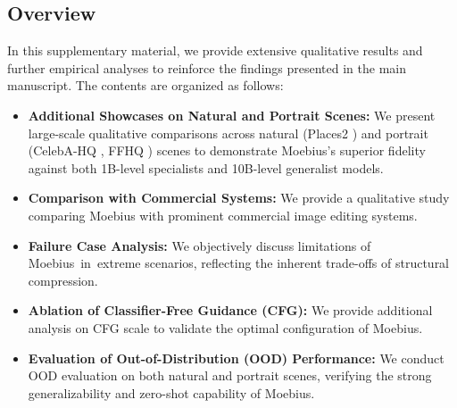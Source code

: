 \documentclass[runningheads]{llncs}
\begin{document}
\subsection*{Overview}
In this supplementary material, we provide extensive qualitative results and further empirical analyses to reinforce the findings presented in the main manuscript. The contents are organized as follows:
\begin{itemize}
    \item \textbf{Additional Showcases on Natural and Portrait Scenes:} We present large-scale qualitative comparisons across natural (Places2 \cite{zhou2017places}) and portrait (CelebA-HQ \cite{karras2018celebahq}, FFHQ \cite{karras2018stylegan_ffhq}) scenes to demonstrate Moebius's superior fidelity against both 1B-level specialists and 10B-level generalist models.
    \item \textbf{Comparison with Commercial Systems:} We provide a qualitative study comparing Moebius with prominent commercial image editing systems.
    \item \textbf{Failure Case Analysis:} We objectively discuss limitations of Moebius~in~extreme scenarios, reflecting the inherent trade-offs of structural compression.
    \item \textbf{Ablation of Classifier-Free Guidance (CFG):} We provide additional analysis on CFG \cite{ho2022CFG} scale to validate the optimal configuration of Moebius.
    \item \textbf{Evaluation of Out-of-Distribution (OOD) Performance:} We conduct OOD evaluation on both natural and portrait scenes, verifying the strong generalizability and zero-shot capability of Moebius.
\end{itemize}

\end{document}
